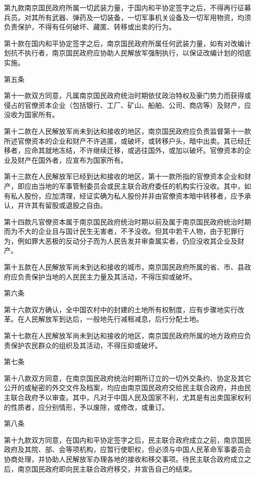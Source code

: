 \begin{maonote}
第九款南京国民政府所属一切武装力量，于国内和平协定签字之后，不得再行征募兵员。对其所有武器、弹药及一切装备，一切军事机关设备及一切军用物资，均须负责保护，不得有任何破坏、藏匿、转移或出卖的行为。

第十款在国内和平协定签字之后，南京国民政府所属任何武装力量，如有对改编计划抗不执行者，南京国民政府应协助人民解放军强制执行，以保证改编计划的彻底实施。

第五条

第十一款双方同意，凡属南京国民政府统治时期依仗政治特权及豪门势力而获得或侵占的官僚资本企业（包括银行、工厂、矿山、船舶、公司、商店等）及财产，应没收为国家所有。

第十二款在人民解放军尚未到达和接收的地区，南京国民政府应负责监督第十一款所述官僚资本的企业和财产不许逃匿，或破坏，或转移户头，暗中出卖。其已经迁移者，应命其就地冻结，不许继续迁移，或逃往国外，或加以破坏。官僚资本的企业及财产在国外者，应宣布为国家所有。

第十三款在人民解放军已经到达和接收的地区，第十一款所指的官僚资本企业和财产，即应由当地的军事管制委员会或民主联合政府委任的机构实行没收。其中，如有私人股份，应加清理，经证实确为私人股份并非由官僚资本暗中转移者，应予承认，并许其有留股或退股之自由。

第十四款凡官僚资本属于南京国民政府统治时期以前及属于南京国民政府统治时期而为不大的企业且与国计民生无害者，不予没收。但其中若干人物，由于犯罪行为，例如罪大恶极的反动分子而为人民告发并审查属实者，仍应没收其企业及财产。

第十五款在人民解放军尚未到达和接收的城市，南京国民政府所属的省、市、县政府应负责保护当地的人民民主力量及其活动，不得压抑或破坏。

第六条

第十六款双方确认，全中国农村中的封建的土地所有权制度，应有步骤地实行改革。在人民解放军到达后，一般地先行减租减息，后行分配土地。

第十七款在人民解放军尚未到达和接收的地区，南京国民政府所属的地方政府应负责保护农民群众的组织及其活动，不得压抑或破坏。

第七条

第十八款双方同意，在南京国民政府统治时期所订立的一切外交条约、协定及其它公开的或秘密的外交文件及档案，均应由南京国民政府交给民主联合政府，并由民主联合政府予以审查。其中，凡对于中国人民及国家不利，尤其是有出卖国家权利的性质者，应分别情形，予以废除，或修改，或重订。

第八条

第十九款双方同意，在国内和平协定签字之后，民主联合政府成立之前，南京国民政府及其院、部、会等项机构，应暂行使职权，但必须与中国人民革命军事委员会协商处理，并协助人民解放军办理各地的接收和移交事项。待民主联合政府成立之后，南京国民政府即向民主联合政府移交，并宣告自己的结束。


\end{maonote}
